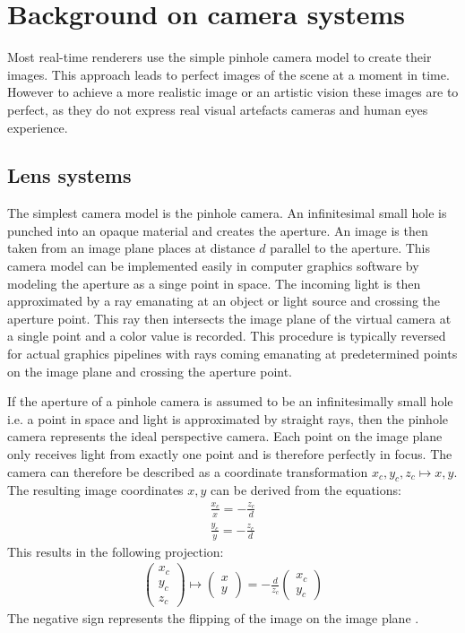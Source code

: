 \chapter{Background on camera systems}
\label{ch:background}
Most real-time renderers use the simple pinhole camera model to create their images.
This approach leads to perfect images of the scene at a moment in time.
However to achieve a more realistic image or an artistic vision these images are to perfect, as they do not express real visual artefacts cameras and human eyes experience.
\section{Lens systems}
\label{ch:background-lens}
The simplest camera model is the pinhole camera.
An infinitesimal small hole is punched into an opaque material and creates the aperture.
An image is then taken from an image plane places at distance $d$ parallel to the aperture.
This camera model can be implemented easily in computer graphics software by modeling the aperture as a singe point in space.
The incoming light is then approximated by a ray emanating at an object or light source and crossing the aperture point.
This ray then intersects the image plane of the virtual camera at a single point and a color value is recorded.
This procedure is typically reversed for actual graphics pipelines with rays coming emanating at predetermined points on the image plane and crossing the aperture point.

If the aperture of a pinhole camera is assumed to be an infinitesimally small hole i.e. a point in space and light is approximated by straight rays, then the pinhole camera represents the ideal perspective camera.
Each point on the image plane only receives light from exactly one point and is therefore perfectly in focus.
The camera can therefore be described as a coordinate transformation $x_c, y_c, z_c \mapsto x, y$.
The resulting image coordinates $x, y$ can be derived from the equations:
\begin{align}
    \frac{x_c}{x} = -\frac{z_c}{d} \\
    \frac{y_c}{y} = -\frac{z_c}{d}
\end{align}
This results in the following projection:
\begin{align}
    \begin{pmatrix}
    x_c \\
    y_c \\
    z_c
\end{pmatrix} 
\mapsto
\begin{pmatrix}
    x \\
    y
\end{pmatrix}
= -\frac{d}{z_c}
\begin{pmatrix}
    x_c \\
    y_c
\end{pmatrix}
\end{align}
The negative sign represents the flipping of the image on the image plane \cite{Beyerer.2016}.

